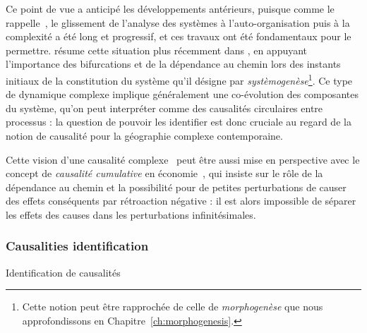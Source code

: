 Ce point de vue a anticipé les développements antérieurs, puisque comme le rappelle~\cite{pumain2003approche}, le glissement de l'analyse des systèmes à l'auto-organisation puis à la complexité a été long et progressif, et ces travaux ont été fondamentaux pour le permettre.  résume cette situation plus récemment dans \cite{durand2003geographes}, en appuyant l'importance des bifurcations et de la dépendance au chemin lors des instants initiaux de la constitution du système qu'il désigne par \emph{systèmogenèse}\footnote{Cette notion peut être rapprochée de celle de \emph{morphogenèse} que nous approfondissons en Chapitre~\ref{ch:morphogenesis}.}. Ce type de dynamique complexe implique généralement une co-évolution des composantes du système, qu'on peut interpréter comme des causalités circulaires entre processus : la question de pouvoir les identifier est donc cruciale au regard de la notion de causalité pour la géographie complexe contemporaine.


Cette vision d'une causalité complexe~\cite{morin1976methode} peut être aussi mise en perspective avec le concept de \emph{causalité cumulative} en économie~\cite{skott1995cumulative}, qui insiste sur le rôle de la dépendance au chemin et la possibilité pour de petites perturbations de causer des effets conséquents par rétroaction négative : il est alors impossible de séparer les effets des causes dans les perturbations infinitésimales.








\subsubsection{Causalities identification}{Identification de causalités}

